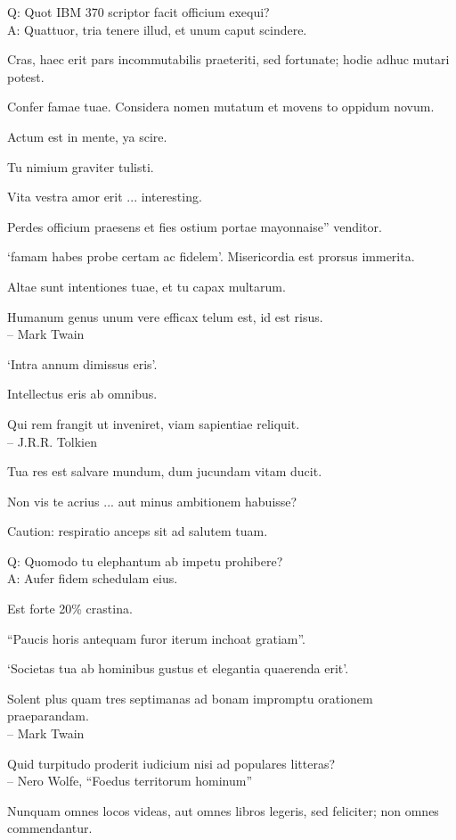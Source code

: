 \documentclass[titlepage,12pt]{memoir}
\begin{document}
Q: Quot IBM 370 scriptor facit officium exequi?\\
A: Quattuor, tria tenere illud, et unum caput scindere.

Cras, haec erit pars incommutabilis praeteriti, sed fortunate;
hodie adhuc mutari potest.

Confer famae tuae. Considera nomen mutatum et movens to
oppidum novum.

Actum est in mente, ya scire.

Tu nimium graviter tulisti.

Vita vestra amor erit ... interesting.

Perdes officium praesens et fies ostium portae mayonnaise”
venditor.

‘famam habes probe certam ac fidelem’.
Misericordia est prorsus immerita.

Altae sunt intentiones tuae, et tu capax multarum.

Humanum genus unum vere efficax telum est, id est risus.
\\-- Mark Twain

‘Intra annum dimissus eris’.

Intellectus eris ab omnibus.

Qui rem frangit ut inveniret, viam sapientiae reliquit.
\\-- J.R.R. Tolkien

Tua res est salvare mundum, dum jucundam vitam ducit.

Non vis te acrius ... aut minus ambitionem habuisse?

Caution: respiratio anceps sit ad salutem tuam.

Q: Quomodo tu elephantum ab impetu prohibere?\\
A: Aufer fidem schedulam eius.

Est forte 20\% crastina.

“Paucis horis antequam furor iterum inchoat gratiam”.

‘Societas tua ab hominibus gustus et elegantia quaerenda erit’.

Solent plus quam tres septimanas ad bonam impromptu orationem praeparandam.
\\-- Mark Twain

Quid turpitudo proderit iudicium nisi ad populares litteras?
\\-- Nero Wolfe, “Foedus territorum hominum”

Nunquam omnes locos videas, aut omnes libros legeris, sed feliciter;
non omnes commendantur.
\end{document}
